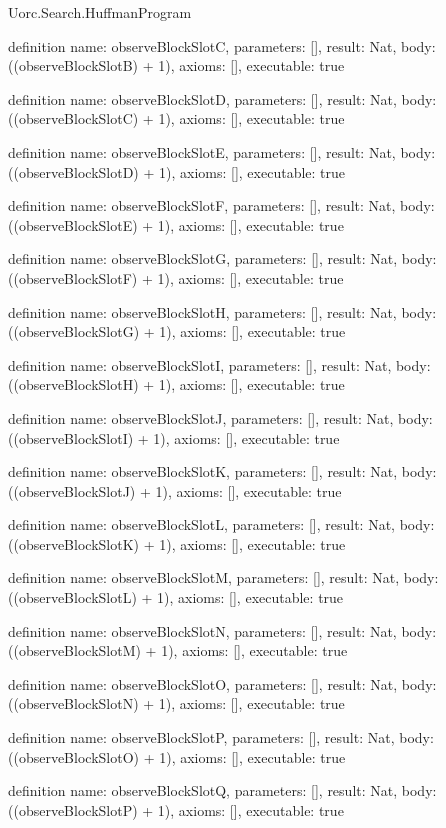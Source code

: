 \begin{lexlean}{Uorc.Search.HuffmanProgram}
\begin{semanticmodule}
definition{
  name: observeBlockSlotC,
  parameters: [],
  result: Nat,
  body: ((observeBlockSlotB) + 1),
  axioms: [],
  executable: true
}

definition{
  name: observeBlockSlotD,
  parameters: [],
  result: Nat,
  body: ((observeBlockSlotC) + 1),
  axioms: [],
  executable: true
}

definition{
  name: observeBlockSlotE,
  parameters: [],
  result: Nat,
  body: ((observeBlockSlotD) + 1),
  axioms: [],
  executable: true
}

definition{
  name: observeBlockSlotF,
  parameters: [],
  result: Nat,
  body: ((observeBlockSlotE) + 1),
  axioms: [],
  executable: true
}

definition{
  name: observeBlockSlotG,
  parameters: [],
  result: Nat,
  body: ((observeBlockSlotF) + 1),
  axioms: [],
  executable: true
}

definition{
  name: observeBlockSlotH,
  parameters: [],
  result: Nat,
  body: ((observeBlockSlotG) + 1),
  axioms: [],
  executable: true
}

definition{
  name: observeBlockSlotI,
  parameters: [],
  result: Nat,
  body: ((observeBlockSlotH) + 1),
  axioms: [],
  executable: true
}

definition{
  name: observeBlockSlotJ,
  parameters: [],
  result: Nat,
  body: ((observeBlockSlotI) + 1),
  axioms: [],
  executable: true
}

definition{
  name: observeBlockSlotK,
  parameters: [],
  result: Nat,
  body: ((observeBlockSlotJ) + 1),
  axioms: [],
  executable: true
}

definition{
  name: observeBlockSlotL,
  parameters: [],
  result: Nat,
  body: ((observeBlockSlotK) + 1),
  axioms: [],
  executable: true
}

definition{
  name: observeBlockSlotM,
  parameters: [],
  result: Nat,
  body: ((observeBlockSlotL) + 1),
  axioms: [],
  executable: true
}

definition{
  name: observeBlockSlotN,
  parameters: [],
  result: Nat,
  body: ((observeBlockSlotM) + 1),
  axioms: [],
  executable: true
}

definition{
  name: observeBlockSlotO,
  parameters: [],
  result: Nat,
  body: ((observeBlockSlotN) + 1),
  axioms: [],
  executable: true
}

definition{
  name: observeBlockSlotP,
  parameters: [],
  result: Nat,
  body: ((observeBlockSlotO) + 1),
  axioms: [],
  executable: true
}

definition{
  name: observeBlockSlotQ,
  parameters: [],
  result: Nat,
  body: ((observeBlockSlotP) + 1),
  axioms: [],
  executable: true
}


\end{semanticmodule}
\end{lexlean}
